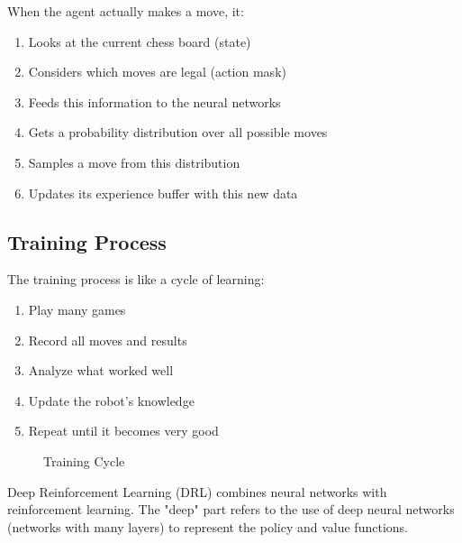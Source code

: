 \documentclass[11pt]{article}
\begin{document}
When the agent actually makes a move, it:
\begin{enumerate}
    \item Looks at the current chess board (state)
    \item Considers which moves are legal (action mask)
    \item Feeds this information to the neural networks
    \item Gets a probability distribution over all possible moves
    \item Samples a move from this distribution
    \item Updates its experience buffer with this new data
\end{enumerate}

\subsection{Training Process}

The training process is like a cycle of learning:
\begin{enumerate}
    \item Play many games
    \item Record all moves and results
    \item Analyze what worked well
    \item Update the robot's knowledge
    \item Repeat until it becomes very good
\end{enumerate}

\begin{figure}[h]
    \centering
    \caption{Training Cycle}
    \label{fig:training_cycle}
\end{figure}

Deep Reinforcement Learning (DRL) combines neural networks with reinforcement learning. The "deep" part refers to the use of deep neural networks (networks with many layers) to represent the policy and value functions.
\end{document}
